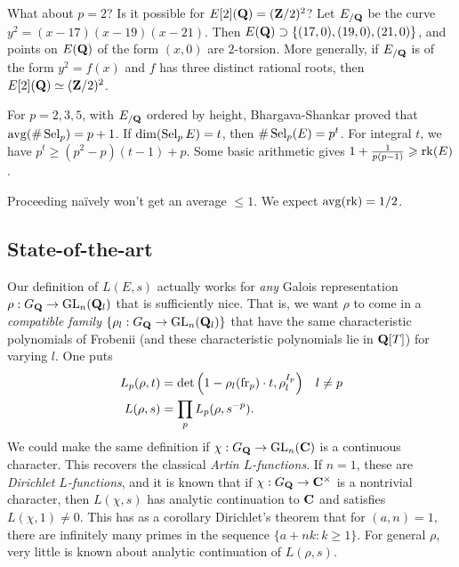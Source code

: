 What about $p=2$? Is it possible for $E[2](\mathbf{Q})=(\mathbf{Z}/2)^2$? Let $E_{/\mathbf{Q}}$ be 
the curve $y^2=(x-17)(x-19)(x-21)$. Then 
$E(\mathbf{Q})\supset \{(17,0),(19,0),(21,0)\}$, and points on 
$E(\mathbf{Q})$ of the form $(x,0)$ are $2$-torsion. More generally, if 
$E_{/\mathbf{Q}}$ is of the form $y^2=f(x)$ and $f$ has three distinct rational roots, 
then $E[2](\mathbf{Q})\simeq (\mathbf{Z}/2)^2$. 

For $p=2,3,5$, with $E_{/\mathbf{Q}}$ ordered by height, Bhargava-Shankar proved that 
$\operatorname{avg}(\#\operatorname{Sel}_p) = p+1$. If 
$\dim(\operatorname{Sel}_pE)=t$, then $\# \operatorname{Sel}_p(E)=p^t$. For integral 
$t$, we have $p^t\geqslant (p^2-p)(t-1)+p$. Some basic arithmetic gives 
$1+\frac{1}{p(p-1)} \geqslant \operatorname{rk}(E)$. 

Proceeding na\"ively won't get an average $\leqslant 1$. 
We expect $\operatorname{avg}(\operatorname{rk} )=1/2$. 





\subsection{State-of-the-art}


Our definition of $L(E,s)$ actually works for \emph{any} Galois representation 
$\rho:G_{\mathbf{Q}}\to \operatorname{GL}_n(\mathbf{Q}_l)$ that is sufficiently nice. That is, we want $\rho$ 
to come in a \emph{compatible family} $\{\rho_l:G_{\mathbf{Q}}\to \operatorname{GL}_n(\mathbf{Q}_l)\}$ that 
have the same characteristic polynomials of Frobenii (and these characteristic 
polynomials lie in $\mathbf{Q}[T]$) for varying $l$. One puts 
\begin{align*}
  L_p(\rho,t) &= \det\left(1-\rho_l(\mathrm{fr}_p)\cdot t,\rho_l^{I_p}\right) && l\ne p \\
  L(\rho,s) &= \prod_p L_p(\rho,s^{-p}) .
\end{align*}
We could make the same definition if $\chi:G_{\mathbf{Q}}\to \operatorname{GL}_n(\mathbf{C})$ is a continuous 
character. This recovers the classical \emph{Artin $L$-functions}. If 
$n=1$, these are \emph{Dirichlet $L$-functions}, and it is known that if 
$\chi:G_{\mathbf{Q}}\to \mathbf{C}^\times$ is a nontrivial character, then $L(\chi,s)$ has 
analytic continuation to $\mathbf{C}$ and satisfies $L(\chi,1)\ne 0$. This has as a 
corollary Dirichlet's theorem that for $(a,n)=1$, there are infinitely many 
primes in the sequence $\{a+n k:k\geqslant 1\}$. For general $\rho$, very 
little is known about analytic continuation of $L(\rho,s)$. 

